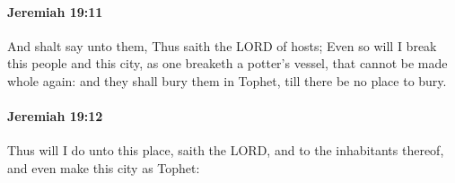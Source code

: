 		\paragraph{Jeremiah 19:11} %
			\label{JEREMIAH-19-11}

			And shalt say unto them, Thus saith the LORD of hosts; Even so will I break this people and this city, as one breaketh a potter’s vessel, that cannot be made whole again: and they shall bury them in Tophet, till there be no place to bury.


		\paragraph{Jeremiah 19:12} %
			\label{JEREMIAH-19-12}

			Thus will I do unto this place, saith the LORD, and to the inhabitants thereof, and even make this city as Tophet:


